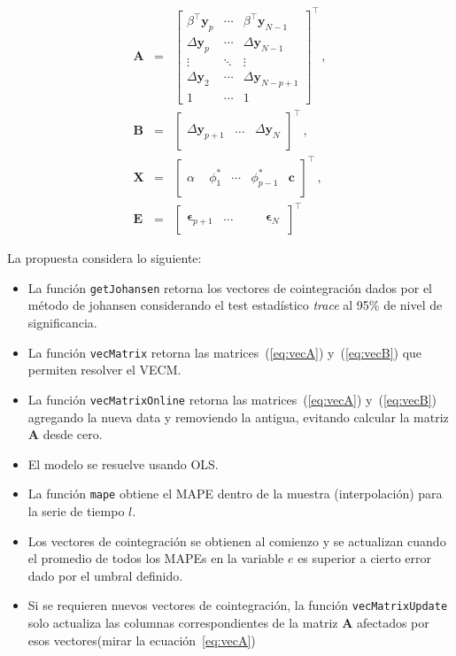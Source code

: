 \begin{eqnarray}\label{eq:vecmatrix}
 \mathbf{A}&=&
   \begin{bmatrix} 
   \beta^\top \mathbf{y}_{p} & 
   \cdots & \beta^\top \mathbf{y}_{N-1} \\
   \Delta \mathbf{y}_p  & \cdots 
   &\Delta\mathbf{y}_{N-1} \\ 
   \vdots  & \ddots & \vdots \\
   \Delta\mathbf{y}_2  & \cdots 
   & \Delta \mathbf{y}_{N-p+1} \\
   1 & \cdots & 1 
   \end{bmatrix}^\top \label{eq:vecA} \, ,\\
\mathbf{B} & = &
 \begin{bmatrix}
 \quad\\
  \Delta \mathbf{y}_{p+1} & 
  \dots &
  \Delta \mathbf{y}_N \label{eq:vecB}\\
  \quad
 \end{bmatrix}^\top \, ,\\
\mathbf{X}&=&
  \begin{bmatrix}
   \quad \\
   \alpha & \phi_1^* & \cdots & \phi_{p-1}^* & \mathbf{c} \\  
   \quad
   \end{bmatrix}^\top \, ,\\
\mathbf{E} &=&
\begin{bmatrix}
   \quad \\
   \mathbf{\epsilon}_{p+1} &
   \dots &
   \quad &\mathbf{\epsilon}_N \, \\ \quad
\end{bmatrix}^\top 
\end{eqnarray}

La propuesta considera lo siguiente:
\begin{itemize}
 \item La función \texttt{getJohansen} retorna los vectores de cointegración
dados por el método de johansen considerando el test estadístico \emph{trace}
al 95\% de nivel de significancia.
 \item La función \texttt{vecMatrix} retorna las matrices~(\ref{eq:vecA})
y~(\ref{eq:vecB}) que permiten resolver el VECM.
 \item La función \texttt{vecMatrixOnline} retorna las matrices~(\ref{eq:vecA})
y~(\ref{eq:vecB}) agregando la nueva data y removiendo la antigua, evitando
calcular la matriz $\mathbf{A}$ desde cero.
 \item El modelo se resuelve usando OLS.
 \item La función \texttt{mape} obtiene el MAPE dentro de la muestra
(interpolación) para la serie de tiempo $l$.
 \item Los vectores de cointegración se obtienen al comienzo y se actualizan
cuando el promedio de todos los MAPEs en la variable $e$ es superior a cierto
error dado por el umbral definido.
 \item Si se requieren nuevos vectores de cointegración, la función
\texttt{vecMatrixUpdate} solo actualiza las columnas correspondientes de la
matriz $\mathbf{A}$ afectados por esos vectores(mirar la
ecuación~\ref{eq:vecA})
\end{itemize}


